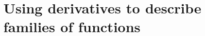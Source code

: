 \section{Using derivatives to describe families of functions} \label{S:3.2.Families}



\newpage



\newpage



\newpage



\newpage

\clearpage

